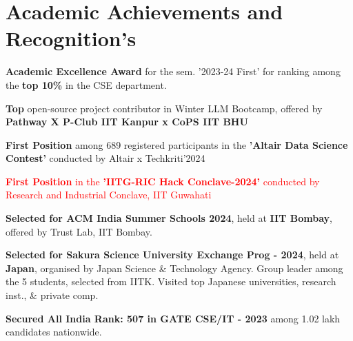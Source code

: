 \documentclass[10.8pt, a4paper]{extarticle}
\newcommand{\shorterSection}[1]{\vspace{-10pt}\section{#1}}
\begin{document}
\shorterSection{Academic Achievements and Recognition's}
\begin{itemize}

 \item \textbf{Academic Excellence Award} for the sem. '2023-24 First' for ranking among the \textbf{top 10\%} in the CSE department.\href{https://www.iitk.ac.in/sspc/data/2nd-list-of-Academic-Excellence-Awards-2023-21-03-24.pdf}{\faLink{}} \href{https://drive.google.com/file/d/1jnb98lF2TscnxkIrKWC_X26nIbIIifDF/view?usp=sharing}{\faLink{}} \\[-0.6cm]
 
 
  \item {\textbf{Top }}open-source project contributor in Winter LLM Bootcamp, offered by \textbf{Pathway X P-Club IIT Kanpur x CoPS IIT BHU} \href{https://t.certifier.io/CL0/https:%2F%2Fapi.credsverse.com%2Fv1%2Fusers%2Finvite%2Fceed2b44-26ae-4085-a1c6-291760efed0a/1/0102018ede88dc5e-89a09bd7-6cea-4807-a2c9-3dff747834d9-000000/_U00joiSf7_qp3anDSJNAiO00y7Hxm7ONFmpv6zOP2g=348}{\faLink{}}\\[-0.6cm]

  \item \textbf{First Position} among 689 registered participants in the \textbf{'Altair Data Science Contest'} conducted by Altair x Techkriti'2024 \href{https://drive.google.com/file/d/1D9f-N0dg1hDBg25C0PcwicyXPSVoKH6y/view?usp=sharing}{\faLink{}}
\textcolor{red}{ \item \textbf{First Position} in the \textbf{'IITG-RIC Hack Conclave-2024'} conducted by Research and Industrial Conclave, IIT Guwahati \href{https://drive.google.com/file/d/1D9f-N0dg1hDBg25C0PcwicyXPSVoKH6y/view?usp=sharing}{\faLink{}} }

    \item {\textbf{Selected for ACM India Summer Schools 2024}}, held at {\textbf{IIT Bombay}}, offered by Trust Lab, IIT Bombay. \href{https://drive.google.com/file/d/1mHDlgpKEQpYF-BHE-QLPfYljADycJgEZ/view?usp=sharing}{\faLink{}}
    \href{https://trustlab.iitb.ac.in/trust-matters-2024-jun-summer-school-on-cryptography}{\faLink{}}


   \item {\textbf{Selected for Sakura Science University Exchange Prog - 2024}}, held at {\textbf{Japan}}, organised by Japan Science \& Technology Agency. Group leader among the 5 students, selected from IITK. Visited top Japanese universities, research inst., \& private comp.   \href{https://drive.google.com/file/d/1cprXZQaC9tLiOLi9QPF0u9wuk8HzhmZm/view?usp=sharing}{\faLink{}}
   \href{https://www.iitk.ac.in/oir/data/list-of-students-sakura-14-06-24.pdf}{\faLink{}}

   \item \textbf{ Secured All India Rank: 507 in GATE CSE/IT - 2023} among 1.02 lakh candidates nationwide. \href{https://drive.google.com/file/d/1IkVH0v_xUTgL83VHjq7N5oFpSjw99Zma/view?usp=drive_link}{}


\end{itemize}
\medskip
\end{document}
